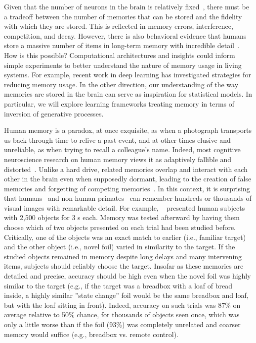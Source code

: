 \def\argmin{\mathop{arg\,min}}

\label{sec:aim4}

Given that the number of neurons in the brain is relatively fixed~\citep{Pakkenberg:1997,West:1994}, there must be a tradeoff between the number of
memories that can be stored and the fidelity with which they are
stored. This is reflected in memory errors, interference, competition,
and decay. However, there is also behavioral evidence that
humans store a massive number of items in long-term memory with
incredible detail~\citep[see][]{Brady:2011}. How is this possible?
Computational architectures and insights could inform simple
experiments to better understand the nature of memory usage in living
systems. For example, recent work in deep learning has investigated
strategies for reducing memory usage. In the other direction, our
understanding of the way memories are stored in the brain can serve as
inspiration for statistical models. In particular,
we will explore learning frameworks treating memory in terms of
inversion of generative processes.

\biobackground{}Human memory is a paradox, at once exquisite, as when
a photograph transports us back through time to relive a past event,
and at other times elusive and unreliable, as when trying to recall a
colleague's name. Indeed, most cognitive neuroscience research on
human memory views it as adaptively fallible and
distorted~\citep{Schacter:2011}. Unlike a hard drive, related
memories overlap and interact with each other in the brain even when
supposedly dormant, leading to the creation of false memories and forgetting of competing memories~\citep{Kim:2014,Wimber:2015}. In
this context, it is surprising that
humans~\citep{Standing:1973,Brady:2008} and non-human
primates~\citep{Woloszyn:2012,Meyer:2018} can remember
hundreds or thousands of visual images with remarkable detail. For
example, ~\citet{Brady:2008} presented human subjects with 2,500
objects for 3 s each. Memory was tested afterward by having them
choose which of two objects presented on each trial had been studied
before. Critically, one of the objects was an exact match to earlier
(i.e., familiar target) and the other object (i.e., novel foil) varied
in similarity to the target. If the studied objects remained in
memory despite long delays and many intervening items, subjects
should reliably choose the target. Insofar as these memories
are detailed and precise, accuracy should be high even when the novel
foil was highly similar to the target (e.g., if the target
was a breadbox with a loaf of bread inside, a highly similar ''state
change'' foil would be the same breadbox and loaf, but with the loaf
sitting in front). Indeed, accuracy on such trials was 87\% on average
relative to 50\% chance, for thousands of objects seen once, which was
only a little worse than if the foil (93\%) was completely unrelated
and coarser memory would suffice (e.g., breadbox vs. remote control).


